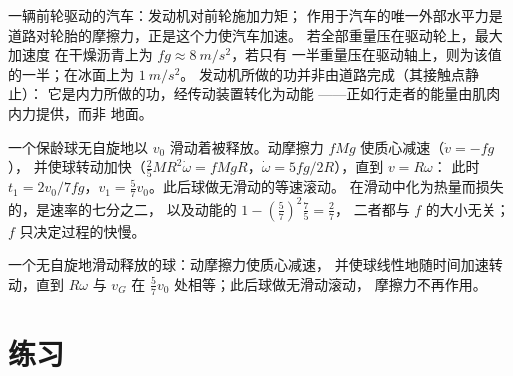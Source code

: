 \begin{example}[为什么汽车加速需要摩擦力]\label{ex:b2:rigid-body-mechanics:car}
一辆前轮驱动的汽车：发动机对前轮施加力矩；
作用于汽车的唯一外部水平力是
道路对轮胎的摩擦力，正是这个力使汽车加速。
若全部重量压在驱动轮上，最大加速度
在干燥沥青上为 $fg \approx \qty{8}{m/s^2}$，若只有
一半重量压在驱动轴上，则为该值的一半；在冰面上为 $\qty{1}{m/s^2}$。
发动机所做的功并非由道路完成（其接触点静止）：
它是内力所做的功，经传动装置转化为动能
——正如行走者的能量由肌肉内力提供，而非
地面。
\end{example}

\begin{example}[滑动到滚动的过渡]\label{ex:b2:rigid-body-mechanics:bowling}
一个保龄球无自旋地以 $v_0$ 滑动着被释放。动摩擦力 $fMg$ 使质心减速（$\dot v = -fg$），
并使球转动加快（$\tfrac25MR^2\dot\omega = fMgR$，$\dot\omega = 5fg/2R$），直到 $v = R\omega$：
此时 $t_1 = 2v_0/7fg$，$v_1 = \tfrac57v_0$。此后球做无滑动的等速滚动。
在滑动中化为热量而损失的，是速率的七分之二，
以及动能的 $1 - (\tfrac57)^2\tfrac75 = \tfrac27$，
二者都与 $f$ 的大小无关；
$f$ 只决定过程的快慢。
\end{example}

\begin{omfigure}

{\small 一个无自旋地滑动释放的球：动摩擦力使质心减速，
并使球线性地随时间加速转动，直到 $R\omega$
与 $v_G$ 在 $\tfrac57v_0$ 处相等；此后球做无滑动滚动，
摩擦力不再作用。}
\end{omfigure}

\section{练习}

